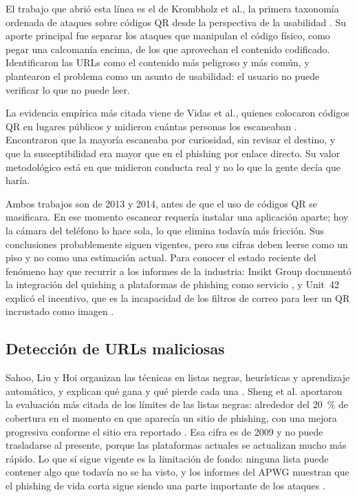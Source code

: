 El trabajo que abrió esta línea es el de Krombholz et al., la primera taxonomía ordenada de ataques sobre códigos QR desde la perspectiva de la usabilidad \cite{krombholz2014qr}. Su aporte principal fue separar los ataques que manipulan el código físico, como pegar una calcomanía encima, de los que aprovechan el contenido codificado. Identificaron las URLs como el contenido más peligroso y más común, y plantearon el problema como un asunto de usabilidad: el usuario no puede verificar lo que no puede leer.

La evidencia empírica más citada viene de Vidas et al., quienes colocaron códigos QR en lugares públicos y midieron cuántas personas los escaneaban \cite{vidas2013qrishing}. Encontraron que la mayoría escaneaba por curiosidad, sin revisar el destino, y que la susceptibilidad era mayor que en el phishing por enlace directo. Su valor metodológico está en que midieron conducta real y no lo que la gente decía que haría.

Ambos trabajos son de 2013 y 2014, antes de que el uso de códigos QR se masificara. En ese momento escanear requería instalar una aplicación aparte; hoy la cámara del teléfono lo hace sola, lo que elimina todavía más fricción. Sus conclusiones probablemente siguen vigentes, pero sus cifras deben leerse como un piso y no como una estimación actual. Para conocer el estado reciente del fenómeno hay que recurrir a los informes de la industria: Insikt Group documentó la integración del quishing a plataformas de phishing como servicio \cite{insikt2024qrcode}, y Unit~42 explicó el incentivo, que es la incapacidad de los filtros de correo para leer un QR incrustado como imagen \cite{unit42_2023qr}.

\subsection{Detección de URLs maliciosas}

Sahoo, Liu y Hoi organizan las técnicas en listas negras, heurísticas y aprendizaje automático, y explican qué gana y qué pierde cada una \cite{sahoo2017malicious}. Sheng et al. aportaron la evaluación más citada de los límites de las listas negras: alrededor del 20~\% de cobertura en el momento en que aparecía un sitio de phishing, con una mejora progresiva conforme el sitio era reportado \cite{sheng2009empirical}. Esa cifra es de 2009 y no puede trasladarse al presente, porque las plataformas actuales se actualizan mucho más rápido. Lo que sí sigue vigente es la limitación de fondo: ninguna lista puede contener algo que todavía no se ha visto, y los informes del APWG muestran que el phishing de vida corta sigue siendo una parte importante de los ataques \cite{apwg2024q1,apwg2025q1}.

